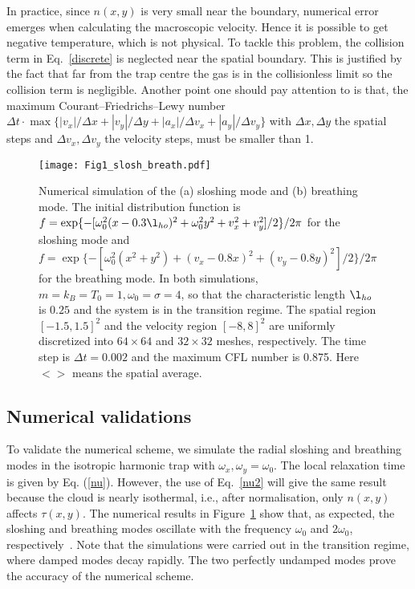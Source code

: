 In practice, since $n(x,y)$ is very small near the boundary, numerical error emerges when calculating the macroscopic velocity. Hence it is possible to get negative temperature, which is not physical. To tackle this problem, the collision term in Eq.~\eqref{discrete} is neglected near the spatial boundary. This is justified by the fact that far from the trap centre the gas is in the collisionless limit so the collision term is negligible. Another point one should pay attention to is that, the maximum Courant–Friedrichs–Lewy number $\Delta t\cdot\operatorname{max}\{|v_x|/\Delta x+|v_y|/\Delta y+|a_x|/\Delta v_x+|a_y|/\Delta v_y\}$ with $\Delta x, \Delta y$ the spatial steps and $\Delta v_x, \Delta v_y$ the velocity steps, must be smaller than 1.



\begin{figure}[t]
\center
\texttt{[image: Fig1\_slosh\_breath.pdf]}
\caption[Numerical simulation of the (a) sloshing mode and (b) breathing mode.]{Numerical simulation of the (a) sloshing mode and (b) breathing mode. The initial distribution function is $f=\exp\{-[\omega_0^2(x-0.3\l_{ho})^2+\omega_0^2y^2+v_x^2+v_y^2]/2\}/2\pi$ for the sloshing mode and $f=\exp\{-[\omega_0^2(x^2+y^2)+(v_x-0.8x)^2+(v_y-0.8y)^2]/2\}/2\pi$ for the breathing mode. In both simulations, $m=k_B=T_0=1, \omega_0=\sigma=4$, so that the characteristic length $\l_{ho}$ is $0.25$ and the system is in the transition regime. The spatial region $[-1.5,1.5]^2$ and the velocity region $[-8,8]^2$ are uniformly discretized into $64\times64$ and $32\times32$ meshes, respectively. The time step is $\Delta t=0.002$ and the maximum CFL number is 0.875. Here $<>$ means the spatial average. }
\label{fig.1}
\end{figure}

\subsection{Numerical validations}


To validate the numerical scheme, we simulate the radial sloshing and breathing modes in the isotropic harmonic trap with $\omega_x,\omega_y=\omega_0$. The local relaxation time is given by Eq. (\ref{nu}). However, the use of Eq.~\eqref{nu2} will give the same result because the cloud is nearly isothermal, i.e., after normalisation, only $n(x,y)$ affects $\tau(x,y)$.  The numerical results in Figure~\ref{fig.1} show that, as expected, the sloshing and breathing modes oscillate with the frequency $\omega_0$ and $2\omega_0$, respectively~\cite{Guery-Odelin1999, Lepers2010}. Note that the simulations were carried out in the transition regime, where damped modes decay rapidly. The two perfectly undamped modes prove the accuracy of the numerical scheme.



